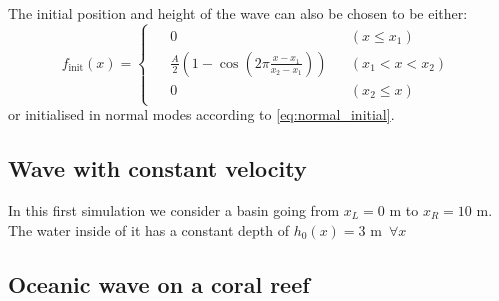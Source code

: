 The initial position and height of the wave can also be chosen to be either:
\begin{equation}
    f_\textrm{init}(x) = \begin{cases}
        \begin{aligned}
            &0 &&(x \le x_1)\\
            & {\frac{A}{2} \left( 1 - \cos \left( 2\pi\frac{x-x_1}{x_2-x_1} \right) \right)} &&(x_1 < x < x_2)\\
            &0 &&(x_2 \le x)
        \end{aligned}
    \end{cases}
\end{equation}
or initialised in normal modes according to \autoref{eq:normal_initial}.




\subsection{Wave with constant velocity}
In this first simulation we consider a basin going from $x_L = 0$ \si{\meter} to $x_R = 10$ \si{\meter}. The water inside of it has a constant depth of $h_0(x) = 3$ \si{\meter} $\, \forall x$













\subsection{Oceanic wave on a coral reef}

